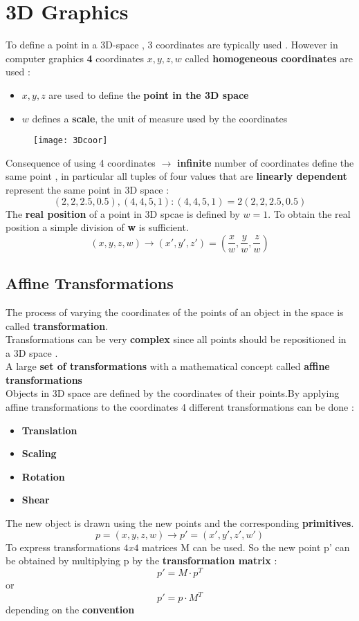 \section{3D Graphics}
To define a point in a 3D-space , 3 coordinates are typically used . However in computer graphics \textbf{4} coordinates $x,y,z,w$ called \textbf{homogeneous coordinates} are used :
\begin{itemize}
\item $x,y,z$ are used to define the \textbf{point in the 3D space}
\item $w$ defines a \textbf{scale}, the unit of measure used by the coordinates
\end{itemize}
\begin{figure}[H]
\centering
  \texttt{[image: 3Dcoor]}
\end{figure}
Consequence of using 4 coordinates $\to$  \textbf{infinite} number of coordinates define the same point , in particular all tuples of four values that are \textbf{linearly dependent} represent the same point in 3D space :
$$  (2,2,2.5,0.5),(4,4,5,1) : (4,4,5,1) = 2(2,2,2.5,0.5)$$
The \textbf{real position} of a point in 3D spcae is defined by $w=1$.
To obtain the real position a simple division of \textbf{w} is sufficient.
$$ (x,y,z,w) \to (x',y',z') = (\frac{x}{w}, \frac{y}{w}, \frac{z}{w})$$

\subsection{Affine Transformations}
The process of varying the coordinates of the points  of an object in the space is called \textbf{transformation}.\\
Transformations can be very \textbf{complex} since all points should be repositioned  in a 3D space .\\A large \textbf{set of transformations} with a mathematical concept called \textbf{affine transformations}\\
Objects in 3D space are defined by the coordinates of their points.By applying affine transformations to the coordinates 4 different transformations can be done :
\begin{itemize}
\item \textbf{Translation}
\item \textbf{Scaling}
\item \textbf{Rotation}
\item \textbf{Shear}
\end{itemize}
The new object is drawn using the new points and the corresponding \textbf{primitives}.\\
$$ p=(x,y,z,w) \to p'=(x',y',z',w') $$ 
To express transformations $4x4 $ matrices M can be used. So the new point p' can be obtained by multiplying p by the \textbf{transformation matrix} :
$$ p' = M\cdot p^T $$ or $$ p' = p \cdot M^T $$
depending on the \textbf{convention}

